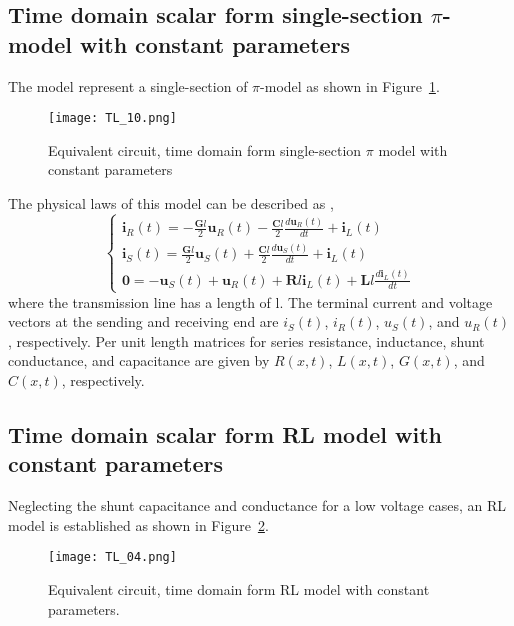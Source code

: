 \subsection{Time domain scalar form single-section $\pi$-model with constant parameters}\label{subsec:ch3/sec3/sub1}
The model represent a single-section of $\pi$-model as shown in Figure~\cref{fig:tl_10}. 
\begin{figure}[htbp]
    \centering
    \texttt{[image: TL\_10.png]}
    \caption{Equivalent circuit, time domain form single-section $\pi$ model with constant parameters}
    \label{fig:tl_10}
\end{figure}

The physical laws of this model can be described as \autocite{Liu2017TL, 9154583},
\begin{equation}
    \left\{\begin{array}{c}
        \displaystyle \mathbf{i}_{R}(t)=-\frac{\mathbf{G} l}{2} \mathbf{u}_{R}(t)-\frac{\mathbf{C} l}{2} \frac{d \mathbf{u}_{R}(t)}{d t}+\mathbf{i}_{L}(t) \\[1em]
        \displaystyle \mathbf{i}_{S}(t)=\frac{\mathbf{G} l}{2} \mathbf{u}_{S}(t)+\frac{\mathbf{C} l}{2} \frac{d \mathbf{u}_{S}(t)}{d t}+\mathbf{i}_{L}(t) \\[1em]
        \displaystyle \mathbf{0}=-\mathbf{u}_{S}(t)+\mathbf{u}_{R}(t)+\mathbf{R} l \mathbf{i}_{L}(t)+\mathbf{L} l \frac{d \mathbf{i}_{L}(t)}{d t}
    \end{array}\right.
\end{equation}
where the transmission line has a length of l. The terminal current and voltage vectors at the sending and receiving end are $i_S(t)$, $i_R(t)$, $u_S(t)$, and $u_R(t)$, respectively. Per unit length matrices for series resistance, inductance, shunt conductance, and capacitance are given by $R(x,t)$, $L(x,t)$, $G(x,t)$, and $C(x,t)$, respectively.

\subsection{Time domain scalar form RL model with constant parameters}\label{subsec:ch3/sec3/sub2}
Neglecting the shunt capacitance and conductance for a low voltage cases, an RL model is established as shown in Figure~\cref{fig:tl_04}. 
\begin{figure}[htbp]
    \centering
    \texttt{[image: TL\_04.png]}
    \caption{Equivalent circuit, time domain form RL model with constant parameters.}
    \label{fig:tl_04}
\end{figure}

